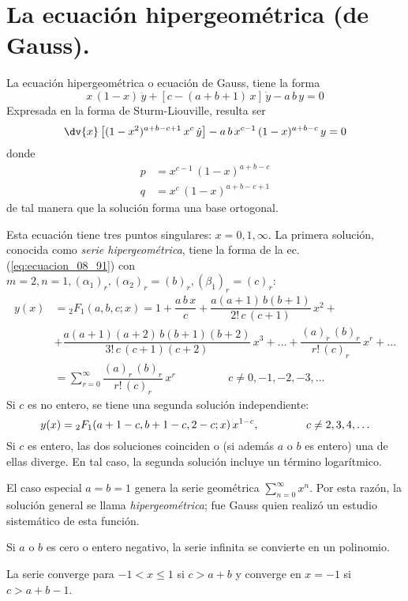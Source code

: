 \section{La ecuación hipergeométrica (de Gauss).}
La ecuación hipergeométrica o ecuación de Gauss, tiene la forma
\[ x \, (1 - x) \, \ddot{y} + [c - (a + b + 1) \, x] \, \dot{y} - a \, b \, y = 0 \]
Expresada en la forma de Sturm-Liouville, resulta ser
\[ \dv{x} \left[ (1 - x^{2})^{a+b-c+1} \, x^{c} \, \dot{y} \right] - a \, b \, x^{c-1} \, (1 - x)^{a+b-c} \, y = 0 \]
donde
\begin{align*}
p &= x^{c-1} \, (1 - x)^{a+b-c} \\
q &= x^{c} \, (1 - x)^{a+b-c+1}
\end{align*}
de tal manera que la solución forma una base ortogonal.
\par
Esta ecuación tiene tres puntos singulares: $x = 0, 1, \infty$. La primera solución, conocida como \emph{serie hipergeométrica}, tiene la forma de la ec. (\ref{eq:ecuacion_08_91}) con $m=2, n=1, (\alpha_{1})_{r}, (\alpha_{2})_{r} = (b)_{r}, (\beta_{1})_{r} = (c)_{r}$:
\begin{align*}
y (x) &= {}_{2} F_{1} (a, b, c ; x) = 1 + \dfrac{a \, b \, x}{c} + \dfrac{a (a + 1) \, b (b + 1)}{2! \, c \, (c + 1)} \, x^{2} + \\
&+ \dfrac{a (a + 1)(a + 2) \, b (b + 1) (b + 2)}{3! \, c \, (c + 1)(c + 2)} \, x^{3} + \ldots + \dfrac{(a)_{r} \, (b)_{r}}{r! \, (c)_{r}} \, x^{r} + \ldots \\
&= \sum_{r=0}^{\infty} \dfrac{(a)_{r} \, (b)_{r}}{r! \, (c)_{r}} \, x^{r} \hspace{2cm} c \neq 0, -1, -2, -3, \ldots
\end{align*}
Si $c$ es no entero, se tiene una segunda solución independiente:
\[ y(x) = {}_{2} F_{1} (a + 1 - c, b + 1 - c, 2 - c; x) \, x^{1-c}, \hspace{1.5cm} c \neq 2, 3, 4, \ldots \]
Si $c$ es entero, las dos soluciones coinciden o (si además $a$ o $b$ es entero) una de ellas diverge. En tal caso, la segunda solución incluye un término logarítmico.
\par
El caso especial $a = b = 1$ genera la serie geométrica $\displaystyle{\sum_{n=0}^{\infty} x^{n}}$. Por esta razón, la solución general se llama \emph{hipergeométrica}; fue Gauss quien realizó un estudio sistemático de esta función.
\par
Si $a$ o $b$ es cero o entero negativo, la serie infinita se convierte en un polinomio.
\par
La serie converge para $-1 < x \leq 1$ si $c > a + b$ y converge en $x = -1$ si $c > a + b - 1$.
